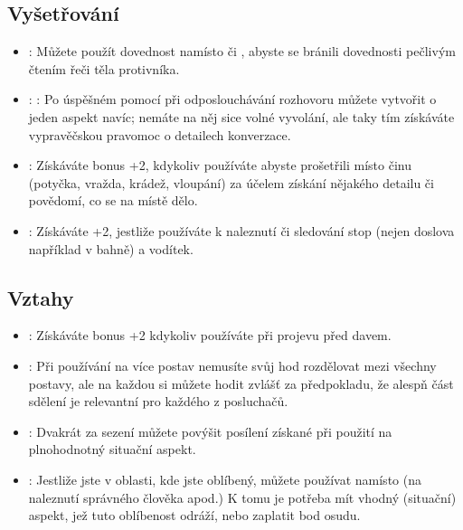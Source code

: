 \documentclass[../main.tex]{subfiles}
\begin{document}
\subsection{Vyšetřování}
\label{sec:trik-vysetrovani}
\begin{itemize}

\item{}:
\label{sec:vysetrovani-mikro}
Můžete použít dovednost  namísto  či , abyste se bránili dovednosti  pečlivým čtením řeči těla protivníka.

\item{}:
\label{sec:vysetrovani-fizlovani}:
Po úspěšném  pomocí  při odposlouchávání rozhovoru můžete vytvořit o jeden aspekt navíc; nemáte na něj sice volné vyvolání, ale taky tím získáváte vypravěčskou pravomoc o detailech konverzace.


\item{}:
\label{sec:vysetrovani-detektiv}
Získáváte bonus +2, kdykoliv používáte  abyste prošetřili místo činu (potyčka, vražda, krádež, vloupání) za účelem získání nějakého detailu či povědomí, co se na místě dělo.

\item{}:
\label{vysetrovani-stopovani}
Získáváte +2, jestliže používáte  k naleznutí či sledování stop (nejen doslova například v bahně) a vodítek.

\end{itemize}
\subsection{Vztahy}
\label{sec:trik-vztahy}
\begin{itemize}

\item{}:
  \label{sec:vztahy-demgagog}
  Získáváte bonus +2 kdykoliv používáte  při projevu před davem.

\item{}:
  \label{sec:vztahy-individual}
  Při používání  na více postav nemusíte svůj hod rozdělovat mezi všechny postavy, ale na každou si můžete hodit zvlášť za předpokladu, že alespň část sdělení je relevantní pro každého z posluchačů.

\item{}:
  \label{sec:vztahy-piti}
  Dvakrát za sezení můžete povýšit posílení získané při použití  na plnohodnotný situační aspekt.

\item{}:
  \label{sec:vztahy-popularni}
  Jestliže jste v oblasti, kde jste oblíbený, můžete používat  namísto  (na naleznutí správného člověka apod.) K tomu je potřeba mít vhodný (situační) aspekt, jež tuto oblíbenost odráží, nebo zaplatit bod osudu.
  
\end{itemize}
\end{document}
